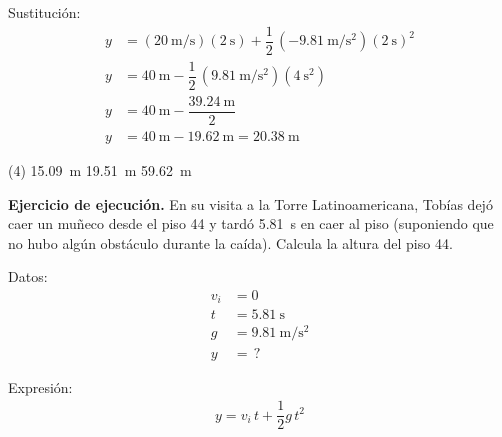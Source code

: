 \documentclass[12pt, letter]{exam}
\begin{document}
\begin{questions}
    Sustitución:
    \begin{align*}
    y &= \left( \displaystyle \SI[per-mode=fraction]{20}{\meter\per\second} \right) (\SI{2}{\second}) + \dfrac{1}{2} \, \left( \displaystyle -\SI[per-mode=fraction]{9.81}{\meter\per\square\second} \right) \left(\SI{2}{\second} \right)^{2} \\[0.5em]
    y &= \SI{40}{\meter} - \dfrac{1}{2} \, \left( \displaystyle \SI[per-mode=fraction]{9.81}{\meter\per\square\second} \right) \left(\SI{4}{\square\second} \right) \\[0.5em]
    y &= \SI{40}{\meter} - \dfrac{\SI{39.24}{\meter}}{2} \\[0.5em]
    y &= \SI{40}{\meter} - \SI{19.62}{\meter} = \SI{20.38}{\meter}
    \end{align*}
    \begin{tasks}(4)
        \task \SI{15.09}{\meter}
        \task \SI{19.51}{\meter}
        \task {}
        \task \SI{59.62}{\meter}
    \end{tasks}
    \setcounter{question}{9} \question \label{Ejercicio_05} \textbf{Ejercicio de ejecución. } En su visita a la Torre Latinoamericana, Tobías dejó caer un muñeco desde el piso \num{44} y tardó \SI{5.81}{\second} en caer al piso (suponiendo que no hubo algún obstáculo durante la caída). Calcula la altura del piso \num{44}.

    \begin{minipage}[t]{0.35\linewidth}
    Datos: 
    \begin{align*}
    v_{i} &= 0 \\
    t &= \SI{5.81}{\second} \\
    g &= \SI{9.81}{\meter\per\square\second} \\
    y &= \, ?
    \end{align*}
    \end{minipage}
    \hspace{1cm}
    \begin{minipage}[t]{0.4\linewidth}
    Expresión:
    \begin{align*}
    y = v_{i} \, t + \dfrac{1}{2} g \, t^{2}
    \end{align*}
    \end{minipage}


\end{questions}
\end{document}
